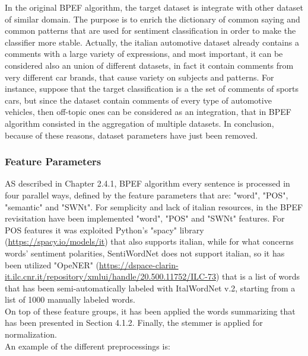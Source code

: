 In the original BPEF algorithm, the target dataset is integrate with other dataset of similar domain. The purpose is to enrich the dictionary of common saying and common patterns that are used for sentiment classification in order to make the classifier more stable. Actually, the italian automotive dataset already contains a comments with a large variety of expressions, and most important, it can be considered also an union of different datasets, in fact it contain comments from very different car brands, that cause variety on subjects and patterns. For instance, suppose that the target classification is a the set of comments of sports cars, but since the dataset contain comments of every type of automotive vehicles, then off-topic ones can be considered as an integration, that in BPEF algorithm consisted in the aggregation of multiple datasets. In conclusion, because of these reasons, dataset parameters have just been removed.


\subsubsection{Feature Parameters}

AS described in Chapter 2.4.1, BPEF algorithm every sentence is processed in four parallel ways, defined by the feature parameters that are: "word", "POS", "semantic" and "SWNt". For semplicity and lack of italian resources, in the BPEF revisitation have been implemented "word", "POS" and "SWNt" features. For POS features it was exploited Python's "spacy" library (\url{https://spacy.io/models/it}) that also supports italian, while for what  concerns words' sentiment polarities, SentiWordNet does not support italian, so it has been utilized "OpeNER" (\url{https://dspace-clarin-it.ilc.cnr.it/repository/xmlui/handle/20.500.11752/ILC-73}) that is a list of words that has been semi-automatically labeled with ItalWordNet v.2, starting from a list of 1000 manually labeled words.\\
On top of these feature groups, it has been applied the words summarizing that has been presented in Section 4.1.2. Finally, the stemmer is applied for normalization.\\
An example of the different preprocessings is:

